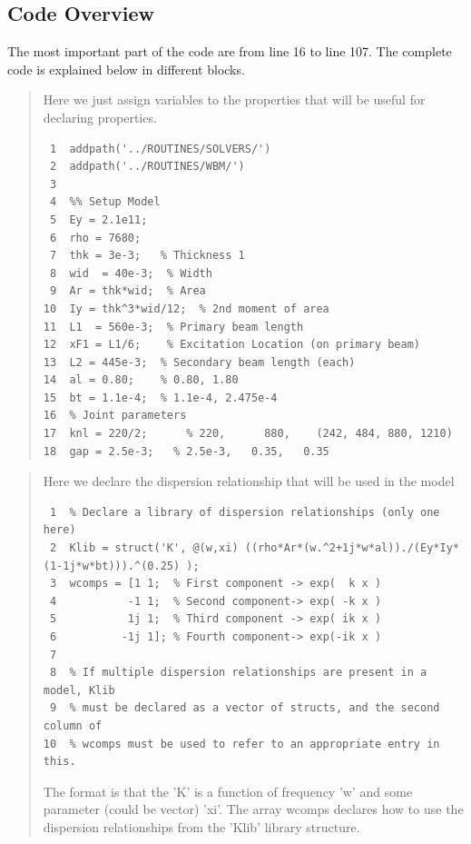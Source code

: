 \documentclass[11pt]{article}
\begin{document}
\subsection{Code Overview}
\label{sec:org1954e0e}
The most important part of the code are from line 16 to line 107. The complete code is explained below in different blocks.
\begin{quote}
                              \begin{tcolorbox}[colback=osbe-bg,colframe=osbe-fg,title={Declare Properties},sharp corners,boxrule=0.4pt]
Here we just assign variables to the properties that will be useful for declaring properties.
\begin{verbatim}
 1  addpath('../ROUTINES/SOLVERS/')
 2  addpath('../ROUTINES/WBM/')
 3  
 4  %% Setup Model
 5  Ey = 2.1e11;
 6  rho = 7680;
 7  thk = 3e-3;   % Thickness 1
 8  wid  = 40e-3;  % Width
 9  Ar = thk*wid;  % Area
10  Iy = thk^3*wid/12;  % 2nd moment of area
11  L1  = 560e-3;  % Primary beam length
12  xF1 = L1/6;    % Excitation Location (on primary beam)
13  L2 = 445e-3;  % Secondary beam length (each)
14  al = 0.80;    % 0.80, 1.80
15  bt = 1.1e-4;  % 1.1e-4, 2.475e-4
16  % Joint parameters
17  knl = 220/2;      % 220,      880,    (242, 484, 880, 1210)
18  gap = 2.5e-3;   % 2.5e-3,   0.35,   0.35
\end{verbatim}


               \end{tcolorbox}
\end{quote}
\begin{quote}
                              \begin{tcolorbox}[colback=osbe-bg,colframe=osbe-fg,title={Declare Dispersion Relationship},sharp corners,boxrule=0.4pt]
Here we declare the dispersion relationship that will be used in the model
\begin{verbatim}
 1  % Declare a library of dispersion relationships (only one here) 
 2  Klib = struct('K', @(w,xi) ((rho*Ar*(w.^2+1j*w*al))./(Ey*Iy*(1-1j*w*bt))).^(0.25) ); 
 3  wcomps = [1 1;  % First component -> exp(  k x )
 4           -1 1;  % Second component-> exp( -k x )
 5           1j 1;  % Third component -> exp( ik x )
 6          -1j 1]; % Fourth component-> exp(-ik x )
 7  
 8  % If multiple dispersion relationships are present in a model, Klib
 9  % must be declared as a vector of structs, and the second column of
10  % wcomps must be used to refer to an appropriate entry in this.
\end{verbatim}
The format is that the 'K' is a function of frequency 'w' and some parameter (could be vector) 'xi'. The array wcomps declares how to use the dispersion relationships from the 'Klib' library structure.


               \end{tcolorbox}
\end{quote}
\end{document}

